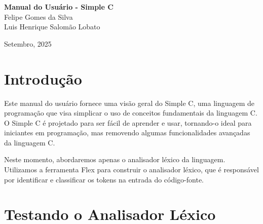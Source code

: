 \documentclass[12pt,a4paper]{article}
\begin{document}
\begin{titlepage}
	\begin{center}
	
	\vspace{115pt}
    \textbf{\Huge{Manual do Usuário - Simple C}}\\
        
	\vspace{115pt}
    Felipe Gomes da Silva \\
    Luis Henrique Salomão Lobato \\
	\end{center}
	
	\vspace{1cm}
	\begin{center}
		\vspace{\fill}
    \large{Setembro, 2025} 
	\end{center}
\end{titlepage}


\tableofcontents
\newpage
\section{Introdução}
Este manual do usuário fornece uma visão geral do Simple C, uma linguagem de programação que visa simplicar o uso de conceitos fundamentais da linguagem C. O Simple C é projetado para ser fácil de aprender e usar, tornando-o ideal para iniciantes em programação, mas removendo algumas funcionalidades avançadas da linguagem C. 

Neste momento, abordaremos apenas o analisador léxico da linguagem. Utilizamos a ferramenta Flex para construir o analisador léxico, que é responsável por identificar e classificar os tokens na entrada do código-fonte.

\section{Testando o Analisador Léxico}
\end{document}
